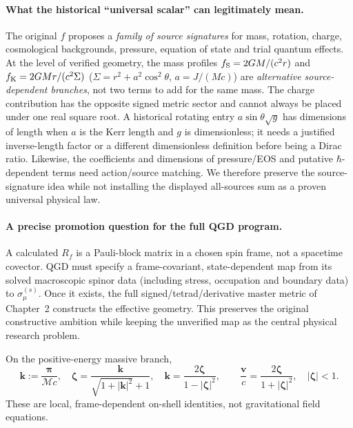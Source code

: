 \documentclass[11pt,a4paper]{article}
\begin{document}
\paragraph{What the historical ``universal scalar'' can legitimately mean.}
The original $f$ proposes a \emph{family of source signatures} for mass,
rotation, charge, cosmological backgrounds, pressure, equation of state and
trial quantum effects.  At the level of verified geometry, the mass profiles
$f_{\rm S}=2GM/(c^2r)$ and $f_{\rm K}=2GMr/(c^2\Sigma)$
($\Sigma=r^2+a^2\cos^2\theta$, $a=J/(Mc)$) are \emph{alternative
source-dependent branches}, not two terms to add for the same mass.
The charge contribution has the opposite signed metric sector and cannot
always be placed under one real square root.  A historical rotating entry
$a\sin\theta\sqrt{g}$ has dimensions of length when $a$ is the Kerr
length and $g$ is dimensionless; it needs a justified inverse-length factor
or a different dimensionless definition before being a Dirac ratio.
Likewise, the coefficients and dimensions of pressure/EOS and putative
$\hbar$-dependent terms need action/source matching.  We therefore preserve
the source-signature idea while not installing the displayed all-sources
sum as a proven universal physical law.

\paragraph{A precise promotion question for the full QGD program.}
A calculated $R_f$ is a Pauli-block matrix in a chosen spin frame, not a
spacetime covector.  QGD must specify a frame-covariant, state-dependent
map from its solved macroscopic spinor data (including stress, occupation
and boundary data) to $\sigma_\mu^{(s)}$.  Once it exists, the
full signed/tetrad/derivative master metric of Chapter~2 constructs the
effective geometry.  This preserves the original constructive ambition
while keeping the unverified map as the central physical research problem.

On the positive-energy massive branch,
\begin{equation}\label{eq:qgd-zeta-momentum}
 \bm k:=\frac{\bm\pi}{\mathcal Mc},\quad
 \bm\zeta=\frac{\bm k}{\sqrt{1+|\bm k|^2}+1},\quad
 \boxed{\bm k=\frac{2\bm\zeta}{1-|\bm\zeta|^2}},\qquad
 \frac{\bm v}{c}=\frac{2\bm\zeta}{1+|\bm\zeta|^2},\quad |\bm\zeta|<1.
\end{equation}
These are local, frame-dependent on-shell identities, not gravitational field equations.
\end{document}
